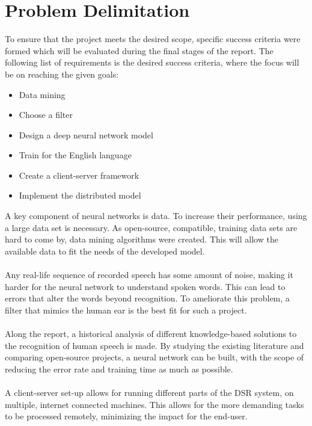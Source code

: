 \section{Problem Delimitation}\label{sec:PD}
To ensure that the project meets the desired scope,
specific success criteria were formed which will be
evaluated during the final stages of the report.
The following list of requirements is the desired
success criteria, where the focus will be on reaching
the given goals:
\begin{itemize}
    \item Data mining
    \item Choose a filter
    \item Design a deep neural network model
    \item Train for the English language
    \item Create a client-server framework
    \item Implement the distributed model
\end{itemize}
A key component of neural networks is data. To increase their performance, using a large data set is necessary. As open-source, compatible, training data sets are hard to come by, data mining algorithms were created. This will allow the available data to fit the needs of the developed model.\\\\
Any real-life sequence of recorded speech has some amount of noise, making it harder for the neural network to understand spoken words.
This can lead to errors that alter the words beyond recognition. 
To ameliorate this problem, a filter that mimics the human
ear is the best fit for such a project.\\\\
Along the report, a historical analysis of different knowledge-based solutions to the recognition of human speech is made.
By studying the existing literature and comparing open-source projects, a neural network can be built, with the scope of reducing the error rate and training time as much
as possible.\\\\
A client-server set-up allows for running different parts of the DSR system, on multiple, internet connected machines. This allows for the more demanding tasks to be processed remotely, minimizing the impact for the end-user.